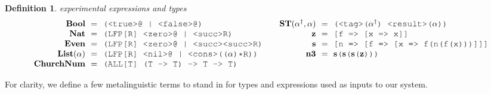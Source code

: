 \documentclass[table,dvipsnames,acmsmall]{acmart}
\theoremstyle{definition}
\newtheorem{definition}{Definition}[section]
\begin{document}
\begin{definition} 
  \label{def:experimental_expressions_and_types}
  \emph{experimental expressions and types} 
  \scriptsize
  \nopad
  \[
  \begin{array}[t]{ll}
    \begin{array}[t]{r@{}c@{}l}
      \textbf{Bool} 
      &\ \ =\ \ & 
      \J{(<true>@ | <false>@)} 
      \\
      \textbf{Nat} 
      &\ \ =\ \ & 
      \J{(LFP[R] <zero>@ | <succ>R)} 
      \\
      \textbf{Even} 
      &\ \ =\ \ & 
      \J{(LFP[R] <zero>@ | <succ><succ>R)} 
      \\
      \textbf{List}(\alpha) 
      &\ \ =\ \ & 
      \J{(LFP[R] <nil>@ | <cons>((}\alpha\J{)*R))} 
      \\
      \textbf{ChurchNum} 
      &\ \ =\ \ & 
      \J{(ALL[T] (T -> T) -> T -> T)}
    \end{array}
    &
    \begin{array}[t]{r@{}c@{}l}
      \textbf{ST}(\alpha^\dagger, \alpha) 
      &\ \ =\ \ & 
      \J{(<tag>(}\alpha^\dagger \J{) <result>(} \alpha \J{))}
      \\
      \textbf{z} 
      &\ \ =\ \ & 
      \J{[f => [x => x]]} 
      \\
      \textbf{s} 
      &\ \ =\ \ & 
      \J{[n => [f => [x => f(n(f(x)))]]]} 
      \\
      \textbf{n3} 
      &\ \ =\ \ & 
      \textbf{s}\J{(}\textbf{s}\J{(}\textbf{s}\J{(}\textbf{z}\J{)}\J{)}\J{)} 
    \end{array}
  \end{array}
  \]
\end{definition}

\noindent
For clarity, we define a few metalinguistic terms to stand in for 
types and expressions used as inputs to our system. 
\end{document}
